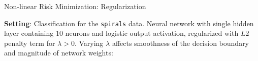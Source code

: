 \begin{frame}{Non-linear Risk Minimization: Regularization}

\small
\textbf{Setting}: Classification for the \texttt{spirals} data.
Neural network with single hidden layer containing 10 neurons and logistic 
output activation, regularized with $L2$ penalty term for $\lambda > 0$.
Varying $\lambda$ affects smoothness of the decision boundary and magnitude of 
network weights:

\vfill

\end{frame}

